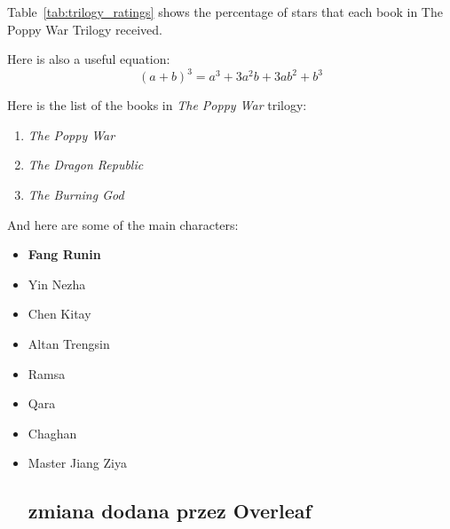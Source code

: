 Table~\ref{tab:trilogy_ratings} shows the percentage of stars that each book in The Poppy War Trilogy received.

\begin{table}[H]
    \centering
    
\end{table}

Here is also a useful equation: \[(a+b)^3=a^3+3a^2b+3ab^2+b^3\]

Here is the list of the books in \textit{The Poppy War} trilogy:
\begin{enumerate}
    \item \textit{The Poppy War}
    \item \textit{The Dragon Republic} 
    \item \textit{The Burning God}
\end{enumerate}

And here are some of the main characters:
\begin{itemize}
    \item \textbf{Fang Runin}
    \item Yin Nezha
    \item Chen Kitay
    \item Altan Trengsin
    \item Ramsa
    \item Qara
    \item Chaghan
    \item Master Jiang Ziya

\subsection{zmiana dodana przez Overleaf}
\end{itemize}


